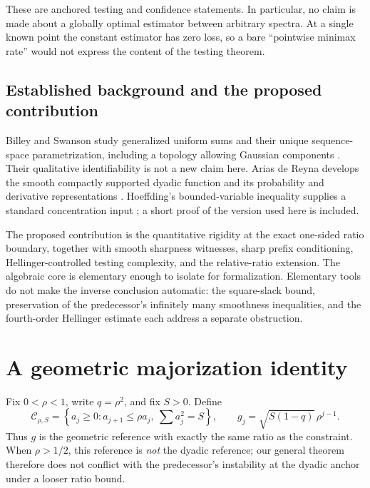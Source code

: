 \documentclass[11pt,a4paper]{article}
\numberwithin{equation}{section}
\theoremstyle{definition}
\theoremstyle{remark}
\newcommand{\C}{\mathcal C}
\begin{document}
These are anchored testing and confidence statements. In particular, no
claim is made about a globally optimal estimator between arbitrary spectra.
At a single known point the constant estimator has zero loss, so a bare
``pointwise minimax rate'' would not express the content of the testing theorem.

\subsection{Established background and the proposed contribution}

Billey and Swanson study generalized uniform sums and their unique
sequence-space parametrization, including a topology allowing Gaussian
components \cite{billey}. Their qualitative identifiability is not a new
claim here. Arias de Reyna develops the smooth compactly supported dyadic
function and its probability and derivative representations \cite{arias}.
Hoeffding's bounded-variable inequality supplies a standard concentration
input \cite{hoeffding}; a short proof of the version used here is included.

The proposed contribution is the quantitative rigidity at the exact
one-sided ratio boundary, together with smooth sharpness witnesses, sharp
prefix conditioning, Hellinger-controlled testing complexity, and the
relative-ratio extension. The algebraic core is elementary enough to isolate
for formalization. Elementary tools do not make the inverse conclusion
automatic: the square-slack bound, preservation of the predecessor's
infinitely many smoothness inequalities, and the fourth-order Hellinger
estimate each address a separate obstruction.

\section{A geometric majorization identity}
\label{sec:majorization}

Fix $0<\rho<1$, write $q=\rho^2$, and fix $S>0$. Define
\begin{equation}
 \C_{\rho,S}=\left\{a_j\ge0:a_{j+1}\le\rho a_j,
                     \ \sum a_j^2=S\right\},
 \qquad
 g_j=\sqrt{S(1-q)}\,\rho^{j-1}.
 \label{eq:general-class}
\end{equation}
Thus $g$ is the geometric reference with exactly the same ratio as the
constraint. When $\rho>1/2$, this reference is \emph{not} the dyadic reference;
our general theorem therefore does not conflict with the predecessor's
instability at the dyadic anchor under a looser ratio bound.
\end{document}
